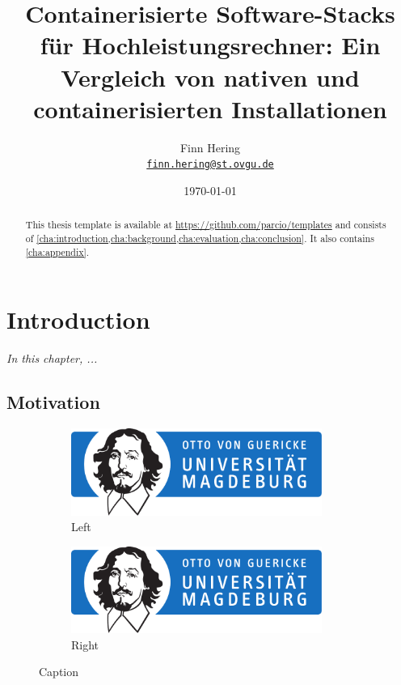 \documentclass[
  12pt,
  a4paper,
  printlength,
  bibliography=totoc,
  chapterprefix,
  headings=openright,
  numbers=endperiod,
  parskip=half,
  twoside
]{scrreprt}
\title{Containerisierte Software-Stacks für Hochleistungsrechner: Ein Vergleich von nativen und containerisierten Installationen}
\author{
  Finn Hering\\
  {\large\href{mailto:finn.hering@st.ovgu.de}{\nolinkurl{finn.hering@st.ovgu.de}}}
}
\date{\today}
\begin{document}
{}

\maketitle

\begin{abstract}
  \lipsum[1]

  This thesis template is available at \url{https://github.com/parcio/templates} and consists of \cref{cha:introduction,cha:background,cha:evaluation,cha:conclusion}.
  It also contains \cref{cha:appendix}.
\end{abstract}

\tableofcontents

\cleardoubleoddpage
{}

\chapter{Introduction}
\label{cha:introduction}

\textit{In this chapter, ...}

\section{Motivation}

\begin{figure}[ht]
  \centering
  \begin{subfigure}{0.45\textwidth}
    \centering
    \includegraphics[width=0.9\textwidth]{OVGU-INF}
    \caption{Left}
    \label{fig:left}
  \end{subfigure}
  \begin{subfigure}{0.45\textwidth}
    \centering
    \includegraphics[width=0.9\textwidth]{OVGU-INF}
    \caption{Right}
    \label{fig:right}
  \end{subfigure}
  \caption{Caption}
  \label{fig:both}
\end{figure}
\end{document}
